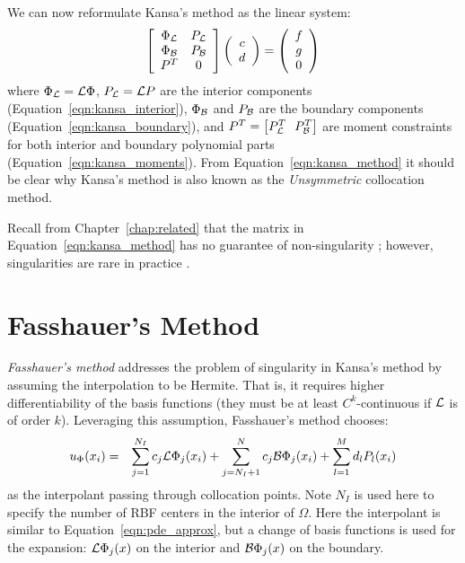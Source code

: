 \documentclass{report}
\begin{document}
{We can now reformulate Kansa's method as the linear system: 
\begin{eqnarray}
\left[ \begin{array}{c c} 
	\Phi_{\mathcal{L}} & P_{\mathcal{L}} \\
	\Phi_{\mathcal{B}} & P_{\mathcal{B}} \\
	P^T & 0
	\end{array} \right] \left( \begin{array}{c}
							{c} \\
							{d}
							 \end{array}
						 \right) = \left( \begin{array}{c}
							{f} \\
							{g} \\
							0
							 \end{array}
						 \right) 
	\label{eqn:kansa_method}
\end{eqnarray}
where $\Phi_{\mathcal{L}} = \mathcal{L}\Phi$, $P_{\mathcal{L}} = \mathcal{L}P$ are the interior components (Equation~\ref{eqn:kansa_interior}), $\Phi_{\mathcal{B}}$ and $P_{\mathcal{B}}$ are the boundary components (Equation~\ref{eqn:kansa_boundary}), and $P^T = \left[P_\diffop{}^T \ \ P_\boundop{}^T\right]$ are moment constraints for both interior and boundary polynomial parts (Equation~\ref{eqn:kansa_moments}). From Equation~\ref{eqn:kansa_method} it should be clear why Kansa's method is also known as the \emph{Unsymmetric} collocation method. 

Recall from Chapter~\ref{chap:related} that the matrix in Equation~\ref{eqn:kansa_method} has no guarantee of non-singularity \cite{Fasshauer1997}; however, singularities are rare in practice \cite{Larsson2003}.

\section{Fasshauer's Method}

\emph{Fasshauer's method} \cite{Fasshauer1997} addresses the problem of singularity in Kansa's method by assuming the interpolation to be Hermite. That is, it requires higher differentiability of the basis functions (they must be at least $C^k$-continuous if $\mathcal{L}$ is of order $k$). Leveraging this assumption, Fasshauer's method chooses: 
\begin{eqnarray}
u_\Phi(x_i) & = & \sum_{j=1}^{N_I}  c_j \mathcal{L}\Phi_j(x_i) + \sum_{j=N_{I} + 1}^{N} c_j \mathcal{B}\Phi_j(x_i) + \sum_{l=1}^{M}d_l P_l(x_i)
\label{eqn:fasshauer_approx}
\end{eqnarray}
as the interpolant passing through collocation points. Note $N_I$ is used here to specify the number of RBF centers in the interior of $\Omega$. Here the interpolant is similar to Equation~\ref{eqn:pde_approx}, but a change of basis functions is used for the expansion: $\mathcal{L}\Phi_j(x)$ on the interior and $\mathcal{B}\Phi_j(x)$ on the boundary.

}
\end{document}
